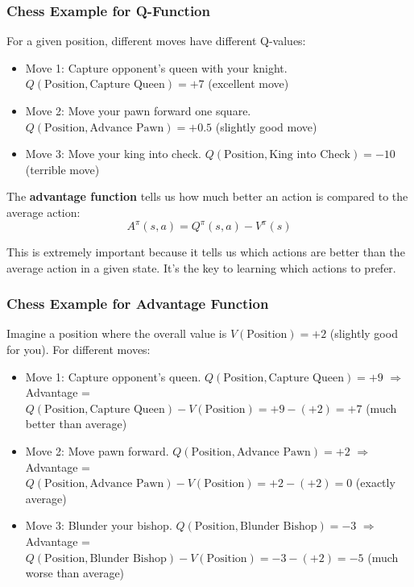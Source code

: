 \documentclass[11pt]{article}
\begin{document}
\subsubsection*{Chess Example for Q-Function}
For a given position, different moves have different Q-values:
\begin{itemize}
    \item Move 1: Capture opponent's queen with your knight. $Q(\text{Position}, \text{Capture Queen}) = +7$ (excellent move)
    \item Move 2: Move your pawn forward one square. $Q(\text{Position}, \text{Advance Pawn}) = +0.5$ (slightly good move)
    \item Move 3: Move your king into check. $Q(\text{Position}, \text{King into Check}) = -10$ (terrible move)
\end{itemize}

The \textbf{advantage function} tells us how much better an action is compared to the average action:
\begin{equation}
    A^\pi(s,a) = Q^\pi(s,a) - V^\pi(s)
\end{equation}

This is extremely important because it tells us which actions are better than the average action in a given state. It's the key to learning which actions to prefer.

\subsubsection*{Chess Example for Advantage Function}
Imagine a position where the overall value is $V(\text{Position}) = +2$ (slightly good for you). For different moves:
\begin{itemize}
    \item Move 1: Capture opponent's queen. $Q(\text{Position}, \text{Capture Queen}) = +9$
    $\Rightarrow$ Advantage = $Q(\text{Position}, \text{Capture Queen}) - V(\text{Position}) = +9 - (+2) = +7$ (much better than average)
    
    \item Move 2: Move pawn forward. $Q(\text{Position}, \text{Advance Pawn}) = +2$
    $\Rightarrow$ Advantage = $Q(\text{Position}, \text{Advance Pawn}) - V(\text{Position}) = +2 - (+2) = 0$ (exactly average)
    
    \item Move 3: Blunder your bishop. $Q(\text{Position}, \text{Blunder Bishop}) = -3$
    $\Rightarrow$ Advantage = $Q(\text{Position}, \text{Blunder Bishop}) - V(\text{Position}) = -3 - (+2) = -5$ (much worse than average)
\end{itemize}
\end{document}
